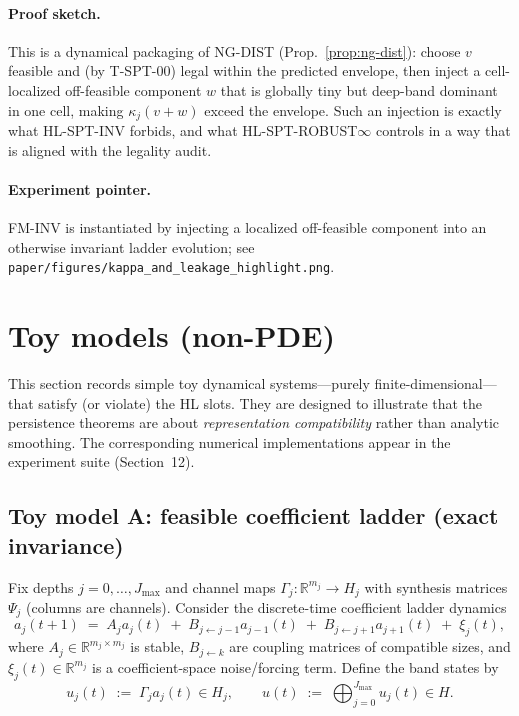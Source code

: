 \documentclass[11pt]{article}
\begin{document}
\paragraph{Proof sketch.}
This is a dynamical packaging of NG-DIST (Prop.~\ref{prop:ng-dist}): choose $v$ feasible and (by T-SPT-00) legal within the predicted envelope, then inject a cell-localized off-feasible component $w$ that is globally tiny but deep-band dominant in one cell, making $\kappa_j(v+w)$ exceed the envelope.
Such an injection is exactly what HL-SPT-INV forbids, and what HL-SPT-ROBUST$\infty$ controls in a way that is aligned with the legality audit.

\paragraph{Experiment pointer.}
FM-INV is instantiated by injecting a localized off-feasible component into an otherwise invariant ladder evolution; see \nolinkurl{paper/figures/kappa_and_leakage_highlight.png}.
 \section{Toy models (non-PDE)}\label{sec:toy-models}

This section records simple toy dynamical systems---purely finite-dimensional---that satisfy (or violate) the HL slots.
They are designed to illustrate that the persistence theorems are about \emph{representation compatibility} rather than analytic smoothing.
The corresponding numerical implementations appear in the experiment suite (Section~12).

\subsection{Toy model A: feasible coefficient ladder (exact invariance)}

Fix depths $j=0,\dots,J_{\max}$ and channel maps $\Gamma_j:\mathbb{R}^{m_j}\to H_j$ with synthesis matrices $\Psi_j$ (columns are channels).
Consider the discrete-time coefficient ladder dynamics
\begin{equation}\label{eq:toy-ladder}
a_j(t+1)
\;=\;
A_j a_j(t)
\;+\;
B_{j\leftarrow j-1}a_{j-1}(t)
\;+\;
B_{j\leftarrow j+1}a_{j+1}(t)
\;+\;
\xi_j(t),
\end{equation}
where $A_j\in\mathbb{R}^{m_j\times m_j}$ is stable, $B_{j\leftarrow k}$ are coupling matrices of compatible sizes, and $\xi_j(t)\in\mathbb{R}^{m_j}$ is a coefficient-space noise/forcing term.
Define the band states by
\begin{equation}\label{eq:toy-ladder-state}
u_j(t) \;:=\; \Gamma_j a_j(t)\in H_j,
\qquad
u(t) \;:=\; \bigoplus_{j=0}^{J_{\max}} u_j(t)\in H.
\end{equation}
\end{document}
